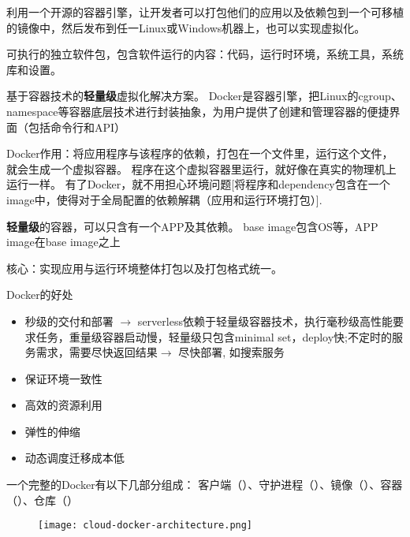 \begin{definition}[容器]
    利用一个开源的容器引擎，让开发者可以打包他们的应用以及依赖包到一个可移植的镜像中，然后发布到任一Linux或Windows机器上，也可以实现虚拟化。 
\end{definition}

\begin{definition}[镜像]
    可执行的独立软件包，包含软件运行的内容：代码，运行时环境，系统工具，系统库和设置。 
\end{definition}

\begin{definition}[Docker]
    基于容器技术的\textbf{轻量级}虚拟化解决方案。 Docker是容器引擎，把Linux的cgroup、namespace等容器底层技术进行封装抽象，为用户提供了创建和管理容器的便捷界面（包括命令行和API）

\end{definition}

Docker作用：将应用程序与该程序的依赖，打包在一个文件里，运行这个文件，就会生成一个虚拟容器。 程序在这个虚拟容器里运行，就好像在真实的物理机上运行一样。 有了Docker，就不用担心环境问题[将程序和dependency包含在一个image中，使得对于全局配置的依赖解耦（应用和运行环境打包）]. 

\textbf{轻量级}的容器，可以只含有一个APP及其依赖。 base image包含OS等，APP image在base image之上

核心：实现应用与运行环境整体打包以及打包格式统一。 

Docker的好处

\begin{itemize}
    \item 秒级的交付和部署 $\rightarrow$ serverless依赖于轻量级容器技术，执行毫秒级高性能要求任务，重量级容器启动慢，轻量级只包含minimal set，deploy快;不定时的服务需求，需要尽快返回结果$\rightarrow$ 尽快部署, 如搜索服务
    \item 保证环境一致性
    \item 高效的资源利用
    \item 弹性的伸缩
    \item 动态调度迁移成本低
\end{itemize}

一个完整的Docker有以下几部分组成：
客户端（）、守护进程（）、镜像（）、容器（）、仓库（）

\begin{figure}[htbp]
    \centering
    \texttt{[image: cloud-docker-architecture.png]}
\end{figure}

